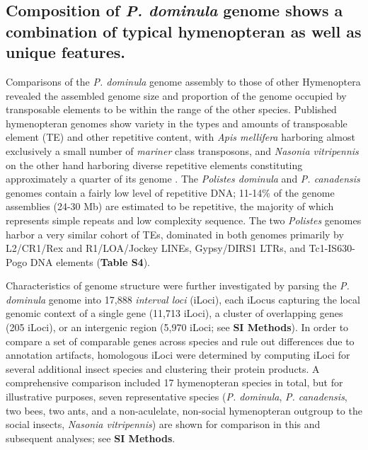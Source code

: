 \subsection{Composition of \textit{P. dominula} genome shows a combination of
typical hymenopteran as well as unique features.} Comparisons of the
\textit{P. dominula} genome assembly to those of other Hymenoptera
revealed the assembled genome size and proportion of the genome occupied
by transposable elements to be within the range of the other species.
Published hymenopteran genomes show variety in the types and amounts of
transposable element (TE) and other repetitive content, with \textit{Apis
mellifera} harboring almost exclusively a small number of \textit{mariner}
class transposons, and \textit{Nasonia vitripennis} on the other hand
harboring diverse repetitive elements constituting approximately a
quarter of its genome \cite{HoneybeeGenome,Werren2010}. The
\textit{Polistes dominula} and \textit{P. canadensis} genomes contain a
fairly low level of repetitive DNA; 11-14\% of the genome assemblies
(24-30 Mb) are estimated to be repetitive, the majority of which
represents simple repeats and low complexity sequence. The two
\textit{Polistes} genomes harbor a very similar cohort of TEs, dominated
in both genomes primarily by L2/CR1/Rex and R1/LOA/Jockey LINEs,
Gypsy/DIRS1 LTRs, and Tc1-IS630-Pogo DNA elements (\textbf{Table S4}).

Characteristics of genome structure were further investigated by parsing
the \textit{P. dominula} genome into 17,888 \textit{interval loci} (iLoci),
each iLocus capturing the local genomic context of a single gene (11,713
iLoci), a cluster of overlapping genes (205 iLoci), or an intergenic
region (5,970 iLoci; see \textbf{SI Methods}). In order to compare a set
of comparable genes across species and rule out differences due to
annotation artifacts, homologous iLoci were determined by computing
iLoci for several additional insect species and clustering their protein
products. A comprehensive comparison included 17 hymenopteran species in
total, but for illustrative purposes, seven representative species
(\textit{P. dominula}, \textit{P. canadensis}, two bees, two ants, and a
non-aculelate, non-social hymenopteran outgroup to the social insects,
\textit{Nasonia vitripennis}) are shown for comparison in this and
subsequent analyses; see \textbf{SI Methods}.

